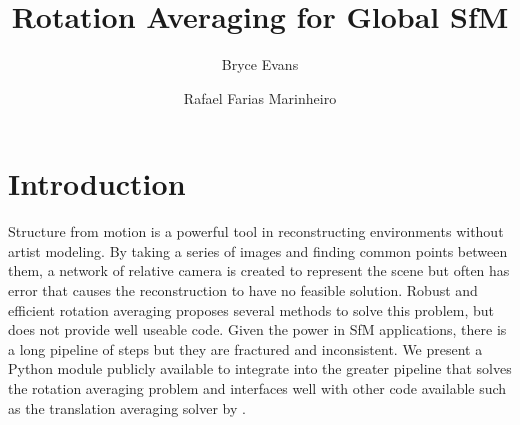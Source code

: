 \documentclass[conference, 12pt]{acmsiggraph}
\title{Rotation Averaging for Global SfM}
\author{Bryce Evans \and Rafael Farias Marinheiro}
\affiliation{Cornell University\thanks{\{bae43, rf356\}@cornell.edu}}
\begin{document}

\maketitle












\section{Introduction}

Structure from motion is a powerful tool in reconstructing environments without artist modeling. By taking a series of images and finding common points between them, a network of relative camera is created to represent the scene but often has error that causes the reconstruction to have no feasible solution. Robust and efficient rotation averaging \cite{rotation} proposes several methods to solve this problem, but does not provide well useable code. Given the power in SfM applications, there is a long pipeline of steps but they are fractured and inconsistent. We present a Python module publicly available to integrate into the greater pipeline that solves the rotation averaging problem and interfaces well with other code available such as the translation averaging solver by \cite{translation}.
\end{document}
